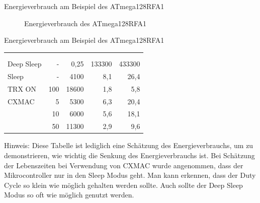 


\begin{frame}{\insertsection}{Energieverbrauch am Beispiel des ATmega128RFA1}
	\begin{figure}[h]
	\centering
  	\caption[t]{Energieverbrauch des ATmega128RFA1}
	\end{figure} 
\end{frame}



\begin{frame}{\insertsection}{Energieverbrauch am Beispiel des ATmega128RFA1}
\centering
\begin{center}
\begin{tabular}{lrrD{,}{,}{1}D{,}{,}{1}}
	\toprule
	& & & 	\tabularnewline
	\cmidrule(l){4-5}
	  & 
	  & 
	  & 
	  & 	\tabularnewline
	\midrule
	Deep Sleep 	& - 	& 0,25	& 133300	& 433300 \tabularnewline
	Sleep		& -		& 4100	& 8,1	& 26,4 \tabularnewline
	TRX ON		& 100	& 18600	& 1,8	& 5,8 \tabularnewline
	CXMAC		& 5		& 5300	& 6,3	& 20,4 \tabularnewline
				& 10	& 6000	& 5,6	& 18,1 \tabularnewline
				& 50	& 11300	& 2,9	& 9,6 \tabularnewline
	\bottomrule
\end{tabular}
\end{center}

\tiny{Hinweis: Diese Tabelle ist lediglich eine Schätzung des Energieverbrauchs,
um zu demonstrieren, wie wichtig die Senkung des Energieverbrauchs ist.
Bei Schätzung der Lebenszeiten bei Verwendung von CXMAC wurde angenommen,
dass der Mikrocontroller nur in den Sleep Modus geht.
Man kann erkennen, dass der Duty Cycle so klein wie möglich gehalten werden sollte.
Auch sollte der Deep Sleep Modus so oft wie möglich genutzt werden.}

\end{frame}




